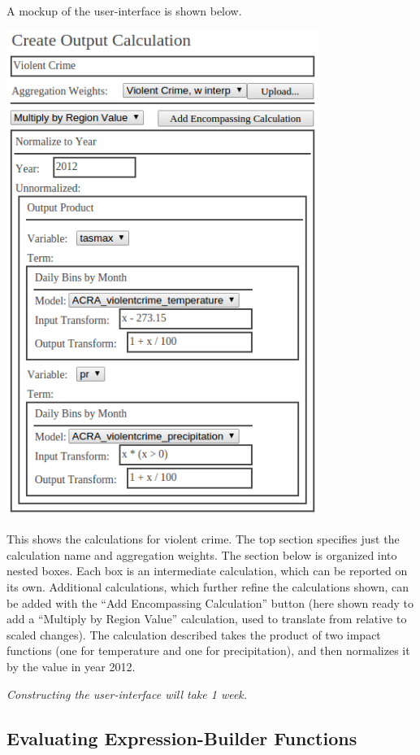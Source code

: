 \documentclass[12pt, oneside]{amsart}
\begin{document}
A mockup of the user-interface is shown below.

\includegraphics[width=4in]{wireframe.png}

This shows the calculations for violent crime.  The top section specifies just the calculation name and aggregation weights.  The section below is organized into nested boxes.  Each box is an intermediate calculation, which can be reported on its own.  Additional calculations, which further refine the calculations shown, can be added with the ``Add Encompassing Calculation'' button (here shown ready to add a ``Multiply by Region Value'' calculation, used to translate from relative to scaled changes).  The calculation described takes the product of two impact functions (one for temperature and one for precipitation), and then normalizes it by the value in year 2012.

{\it Constructing the user-interface will take 1 week.}

\subsection{Evaluating Expression-Builder Functions}
\label{sec:evaluation}
\end{document}
